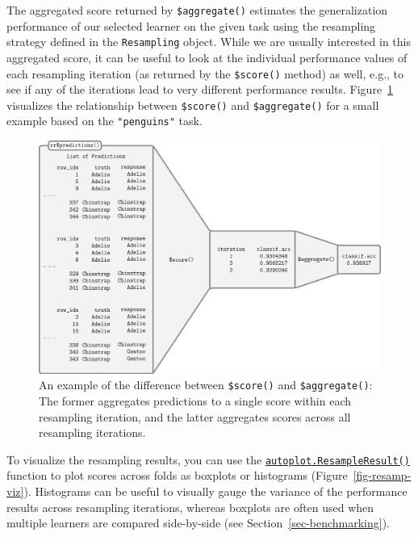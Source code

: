 The aggregated score returned by \texttt{\$aggregate()} estimates the
generalization performance of our selected learner on the given task
using the resampling strategy defined in the \texttt{Resampling} object.
While we are usually interested in this aggregated score, it can be
useful to look at the individual performance values of each resampling
iteration (as returned by the \texttt{\$score()} method) as well, e.g.,
to see if any of the iterations lead to very different performance
results. Figure~\ref{fig-score-aggregate-resampling} visualizes the
relationship between \texttt{\$score()} and \texttt{\$aggregate()} for a
small example based on the \texttt{"penguins"} task.

\begin{figure}

{\centering \includegraphics[width=1\textwidth,height=\textheight]{chapters/chapter3/Figures/mlr3book_figures-5.png}

}

\caption{\label{fig-score-aggregate-resampling}An example of the
difference between \texttt{\$score()} and \texttt{\$aggregate()}: The
former aggregates predictions to a single score within each resampling
iteration, and the latter aggregates scores across all resampling
iterations.}

\end{figure}

To visualize the resampling results, you can use the
\href{https://mlr3viz.mlr-org.com/reference/autoplot.ResampleResult.html}{\texttt{autoplot.ResampleResult()}}
function to plot scores across folds as boxplots or histograms
(Figure~\ref{fig-resamp-viz}). Histograms can be useful to visually
gauge the variance of the performance results across resampling
iterations, whereas boxplots are often used when multiple learners are
compared side-by-side (see Section~\ref{sec-benchmarking}).

